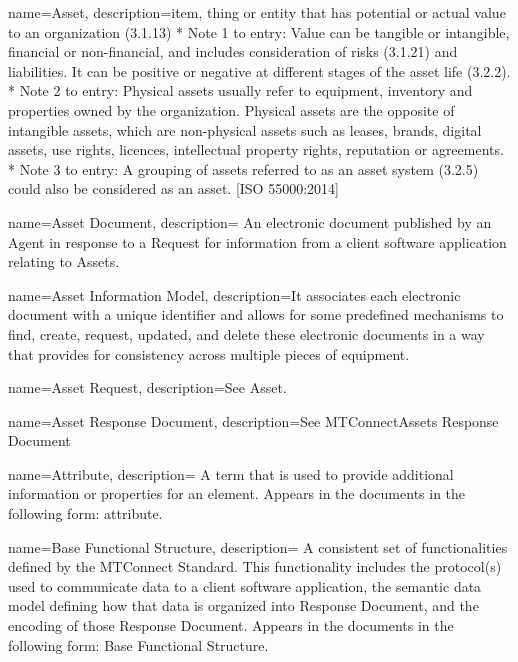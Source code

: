 {
    name={Asset},
	description={item, thing or entity that has potential or actual value to an organization (3.1.13)
* Note 1 to entry: Value can be tangible or intangible, financial or non-financial, and includes consideration of risks (3.1.21) and liabilities. It can be positive or negative at different stages of the asset life (3.2.2).
* Note 2 to entry: Physical assets usually refer to equipment, inventory and properties owned by the organization. Physical assets are the opposite of intangible assets, which are non-physical assets such as leases, brands, digital assets, use rights, licences, intellectual property rights, reputation or agreements.
* Note 3 to entry: A grouping of assets referred to as an asset system (3.2.5) could also be considered as an asset.
[ISO 55000:2014]}
}

{
    name={Asset Document},
	description={
	An electronic document published by an \gls{Agent} in response to a \gls{Request} for information from a client software application relating to Assets.
}
}

{
    name={Asset Information Model},
	description={It associates each electronic  document with a unique identifier and allows for some predefined mechanisms to find, create, request, updated, and delete these electronic documents in a way that provides for consistency across multiple pieces of equipment.}
}

{
    name={Asset Request},
	description={See \gls{Asset}.}
}

{
    name={Asset Response Document},
	description={See \gls{MTConnectAssets Response Document}}
}

{
    name={Attribute},
	description={
  A term that is used to provide additional information or properties for an element.
  Appears in the documents in the following form: attribute.
}
}

{
    name={Base Functional Structure},
	description={
  A consistent set of functionalities defined by the MTConnect Standard. This functionality includes the protocol(s) used to communicate data to a client software application, the \gls{semantic data model} defining how that data is organized into \gls{Response Document}, and the encoding of those \gls{Response Document}.
  Appears in the documents in the following form: \gls{Base Functional Structure}.
}
}

